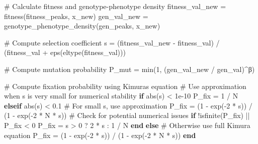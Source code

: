 \documentclass[
]{scrartcl}
\newenvironment{Shaded}{\begin{snugshade}}{\end{snugshade}}
\newcommand{\CommentTok}[1]{\textcolor[rgb]{0.37,0.37,0.37}{#1}}
\newcommand{\ControlFlowTok}[1]{\textcolor[rgb]{0.00,0.23,0.31}{\textbf{#1}}}
\newcommand{\FloatTok}[1]{\textcolor[rgb]{0.68,0.00,0.00}{#1}}
\newcommand{\FunctionTok}[1]{\textcolor[rgb]{0.28,0.35,0.67}{#1}}
\newcommand{\NormalTok}[1]{\textcolor[rgb]{0.00,0.23,0.31}{#1}}
\newcommand{\OperatorTok}[1]{\textcolor[rgb]{0.37,0.37,0.37}{#1}}
\begin{document}
\begin{Shaded}
\begin{Highlighting}[]
        \CommentTok{\# Calculate fitness and genotype{-}phenotype density}
\NormalTok{        fitness\_val\_new }\OperatorTok{=} \FunctionTok{fitness}\NormalTok{(fitness\_peaks, x\_new)}
\NormalTok{        gen\_val\_new }\OperatorTok{=} \FunctionTok{genotype\_phenotype\_density}\NormalTok{(gen\_peaks, x\_new)}

        \CommentTok{\# Compute selection coefficient}
\NormalTok{        s }\OperatorTok{=}\NormalTok{ (fitness\_val\_new }\OperatorTok{{-}}\NormalTok{ fitness\_val) }\OperatorTok{/}
\NormalTok{            (fitness\_val }\OperatorTok{+} \FunctionTok{eps}\NormalTok{(}\FunctionTok{eltype}\NormalTok{(fitness\_val)))}

        \CommentTok{\# Compute mutation probability}
\NormalTok{        P\_mut }\OperatorTok{=} \FunctionTok{min}\NormalTok{(}\FloatTok{1}\NormalTok{, (gen\_val\_new }\OperatorTok{/}\NormalTok{ gen\_val)}\OperatorTok{\^{}}\NormalTok{β)}

        \CommentTok{\# Compute fixation probability using Kimura\textquotesingle{}s equation}
        \CommentTok{\# Use approximation when s is very small for numerical stability}
        \ControlFlowTok{if} \FunctionTok{abs}\NormalTok{(s) }\OperatorTok{\textless{}} \FloatTok{1e{-}10}
\NormalTok{            P\_fix }\OperatorTok{=} \FloatTok{1} \OperatorTok{/}\NormalTok{ N}
        \ControlFlowTok{elseif} \FunctionTok{abs}\NormalTok{(s) }\OperatorTok{\textless{}} \FloatTok{0.1}
            \CommentTok{\# For small s, use approximation}
\NormalTok{            P\_fix }\OperatorTok{=}\NormalTok{ (}\FloatTok{1} \OperatorTok{{-}} \FunctionTok{exp}\NormalTok{(}\OperatorTok{{-}}\FloatTok{2} \OperatorTok{*}\NormalTok{ s)) }\OperatorTok{/}\NormalTok{ (}\FloatTok{1} \OperatorTok{{-}} \FunctionTok{exp}\NormalTok{(}\OperatorTok{{-}}\FloatTok{2} \OperatorTok{*}\NormalTok{ N }\OperatorTok{*}\NormalTok{ s))}
            \CommentTok{\# Check for potential numerical issues}
            \ControlFlowTok{if}\NormalTok{ !}\FunctionTok{isfinite}\NormalTok{(P\_fix) }\OperatorTok{||}\NormalTok{ P\_fix }\OperatorTok{\textless{}} \FloatTok{0}
\NormalTok{                P\_fix }\OperatorTok{=}\NormalTok{ s }\OperatorTok{\textgreater{}} \FloatTok{0}\NormalTok{ ? }\FloatTok{2} \OperatorTok{*}\NormalTok{ s }\OperatorTok{:} \FloatTok{1} \OperatorTok{/}\NormalTok{ N}
            \ControlFlowTok{end}
        \ControlFlowTok{else}
            \CommentTok{\# Otherwise use full Kimura equation}
\NormalTok{            P\_fix }\OperatorTok{=}\NormalTok{ (}\FloatTok{1} \OperatorTok{{-}} \FunctionTok{exp}\NormalTok{(}\OperatorTok{{-}}\FloatTok{2} \OperatorTok{*}\NormalTok{ s)) }\OperatorTok{/}\NormalTok{ (}\FloatTok{1} \OperatorTok{{-}} \FunctionTok{exp}\NormalTok{(}\OperatorTok{{-}}\FloatTok{2} \OperatorTok{*}\NormalTok{ N }\OperatorTok{*}\NormalTok{ s))}
        \ControlFlowTok{end}


\end{Highlighting}
\end{Shaded}
\end{document}
